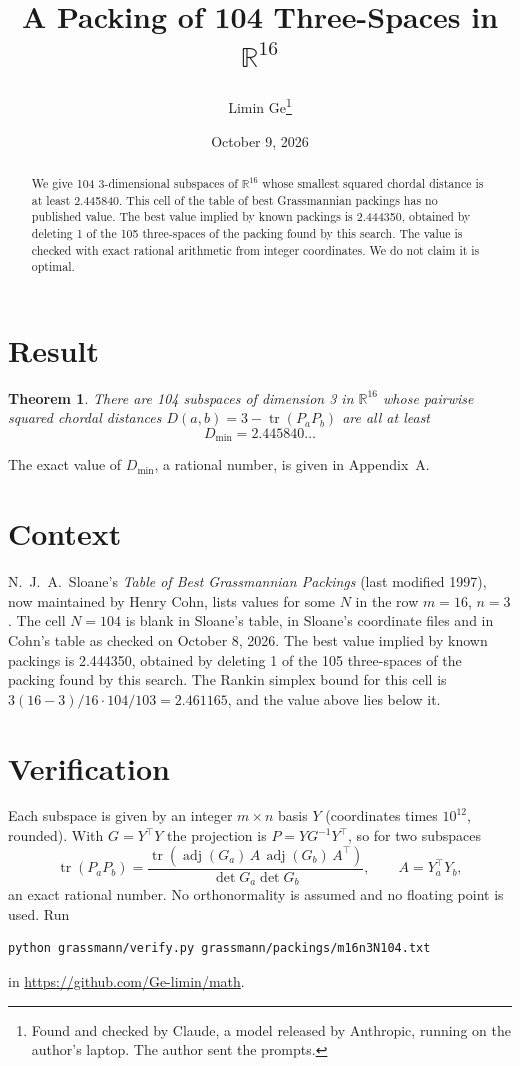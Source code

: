 \documentclass[11pt,a4paper]{article}
\title{A Packing of 104 Three-Spaces in $\mathbb{R}^{16}$}
\author{Limin Ge\thanks{Found and checked by Claude, a model released by Anthropic, running on the author's laptop. The author sent the prompts.}}
\date{October 9, 2026}
\newtheorem*{theorem}{Theorem}
\begin{document}
\maketitle
\begin{abstract}
We give 104 3-dimensional subspaces of $\mathbb{R}^{16}$ whose smallest squared chordal distance is at least 2.445840. This cell of the table of best Grassmannian packings has no published value. The best value implied by known packings is 2.444350, obtained by deleting 1 of the 105 three-spaces of the packing found by this search. The value is checked with exact rational arithmetic from integer coordinates. We do not claim it is optimal.
\end{abstract}

\section{Result}
\begin{theorem}
There are 104 subspaces of dimension 3 in $\mathbb{R}^{16}$ whose pairwise squared chordal distances $D(a,b) = 3 - \operatorname{tr}(P_aP_b)$ are all at least
\[ D_{\min} = 2.445840\ldots \]
\end{theorem}
The exact value of $D_{\min}$, a rational number, is given in Appendix~A.


\section{Context}
N.~J.~A.~Sloane's \emph{Table of Best Grassmannian Packings} (last modified 1997), now maintained by Henry Cohn, lists values for some $N$ in the row $m=16$, $n=3$. The cell $N=104$ is blank in Sloane's table, in Sloane's coordinate files and in Cohn's table as checked on October 8, 2026. The best value implied by known packings is 2.444350, obtained by deleting 1 of the 105 three-spaces of the packing found by this search. The Rankin simplex bound for this cell is $3(16-3)/16\cdot 104/103 = 2.461165$, and the value above lies below it.


\section{Verification}
Each subspace is given by an integer $m\times n$ basis $Y$ (coordinates times $10^{12}$, rounded). With $G=Y^\top Y$ the projection is $P=YG^{-1}Y^\top$, so for two subspaces
\[ \operatorname{tr}(P_aP_b)=\frac{\operatorname{tr}(\operatorname{adj}(G_a)\,A\,\operatorname{adj}(G_b)\,A^\top)}{\det G_a\det G_b},\qquad A=Y_a^\top Y_b, \]
an exact rational number. No orthonormality is assumed and no floating point is used. Run
\begin{verbatim}
python grassmann/verify.py grassmann/packings/m16n3N104.txt
\end{verbatim}
in \url{https://github.com/Ge-limin/math}.
\end{document}
